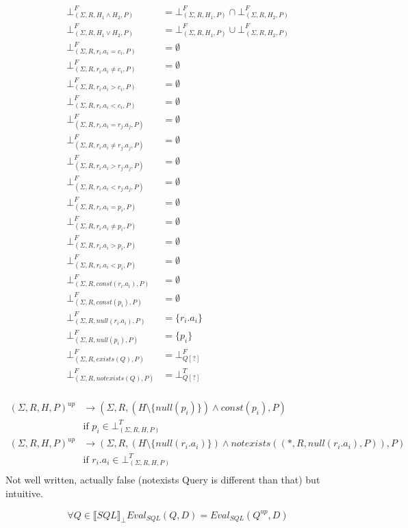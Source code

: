 \begin{mydef}
	\begin{align*}
		\bot^F_{(\Sigma,R,H_1 \land H_2,P)} & = \bot^F_{(\Sigma,R,H_1,P)} \cap \bot^F_{(\Sigma,R,H_2,P)} \\
		\bot^F_{(\Sigma,R,H_1 \lor H_2,P)} & = \bot^F_{(\Sigma,R,H_1,P)} \cup \bot^F_{(\Sigma,R,H_2,P)} \\
		\bot^F_{(\Sigma,R,r_i.a_i = c_i,P)} & =\emptyset \\
		\bot^F_{(\Sigma,R,r_i.a_i \neq c_i,P)} & = \emptyset \\
		\bot^F_{(\Sigma,R,r_i.a_i > c_i,P)} & =\emptyset \\
		\bot^F_{(\Sigma,R,r_i.a_i < c_i,P)} & =\emptyset \\
		\bot^F_{(\Sigma,R,r_i.a_i = r_j.a_j,P)} & = \emptyset \\
		\bot^F_{(\Sigma,R,r_i.a_i \neq r_j.a_j,P)} & = \emptyset \\
		\bot^F_{(\Sigma,R,r_i.a_i > r_j.a_j,P)} & = \emptyset \\
		\bot^F_{(\Sigma,R,r_i.a_i < r_j.a_j,P)} & = \emptyset \\
		\bot^F_{(\Sigma,R,r_i.a_i = p_i,P)} & = \emptyset\\
		\bot^F_{(\Sigma,R,r_i.a_i \neq p_i,P)} & = \emptyset \\
		\bot^F_{(\Sigma,R,r_i.a_i > p_i,P)} & = \emptyset\\
		\bot^F_{(\Sigma,R,r_i.a_i < p_i,P)} & = \emptyset\\
		\bot^F_{(\Sigma,R,const(r_i.a_i),P)} & = \emptyset \\
		\bot^F_{(\Sigma,R,const(p_i),P)} & = \emptyset \\
		\bot^F_{(\Sigma,R,null(r_i.a_i),P)} & = \{r_i.a_i\} \\
		\bot^F_{(\Sigma,R,null(p_i),P)} & = \{p_i\} \\
		\bot^F_{(\Sigma,R,exists(Q),P)} & = \bot^F_{Q[?]} \\
		\bot^F_{(\Sigma,R,notexists(Q),P)} & = \bot^T_{Q[?]}\\
	\end{align*}
\end{mydef}

\begin{mydef}
	\begin{align*}
		(\Sigma,R,H,P)^{up} & \rightarrow (\Sigma,R,(H\setminus \{null(p_i)\}) \land const(p_i),P) \\
		& \mbox{if } p_i \in \bot^T_{(\Sigma,R,H,P)}  \\
		(\Sigma,R,H,P)^{up} & \rightarrow (\Sigma,R,(H\setminus \{null(r_i.a_i)\}) \land notexists((*,R,null(r_i.a_i),P)),P) \\
		& \mbox{if } r_i.a_i \in \bot^T_{(\Sigma,R,H,P)}  \\
	\end{align*}
Not well written, actually false (notexists Query is different than that) but intuitive. 
\end{mydef}

\begin{myprop}
	$$\forall Q \in \llbracket SQL \rrbracket_\bot Eval_{SQL}(Q,D) = Eval_{SQL}(Q^{up},D)$$
\end{myprop}